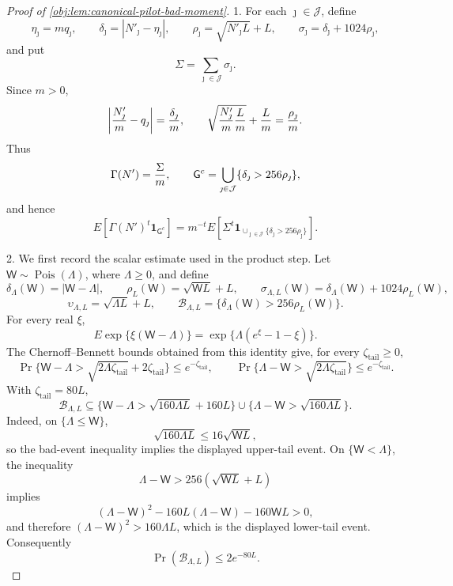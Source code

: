 \documentclass[11pt]{article}
\begin{document}
\begin{proof}[Proof of \cref{obj:lem:canonical-pilot-bad-moment}]
1.  For each \(\jmath\in\mathcal J\), define
\[
\eta_\jmath=mq_\jmath,\qquad
\delta_\jmath=\left|N'_\jmath-\eta_\jmath\right|,
\qquad
\rho_\jmath=\sqrt{N'_\jmath L}+L,
\qquad
\sigma_\jmath=\delta_\jmath+1024\rho_\jmath,
\]
and put
\[
\Sigma=\sum_{\jmath\in\mathcal J}\sigma_\jmath .
\]
Since \(m>0\),
\[
\left|{N'_\jmath\over m}-q_\jmath\right|
={\delta_\jmath\over m},
\qquad
\sqrt{{N'_\jmath\over m}{L\over m}}+{L\over m}
={\rho_\jmath\over m}.
\]
Thus
\[
\Gamma(N')={\Sigma\over m},
\qquad
\mathsf G^c
=
\bigcup_{\jmath\in\mathcal J}
\{\delta_\jmath>256\rho_\jmath\},
\]
and hence
\[
E\!\left[\Gamma(N')^t\mathbf 1_{\mathsf G^c}\right]
=
m^{-t}
E\!\left[
\Sigma^t
\mathbf 1_{\cup_{\jmath\in\mathcal J}\{\delta_\jmath>256\rho_\jmath\}}
\right].
\]

2.  We first record the scalar estimate used in the product step.  Let
\(\mathsf W\sim\operatorname{Pois}(\Lambda)\), where \(\Lambda\ge0\), and define
\[
\delta_{\Lambda}(\mathsf W)=|\mathsf W-\Lambda|,
\qquad
\rho_L(\mathsf W)=\sqrt{\mathsf W L}+L,
\qquad
\sigma_{\Lambda,L}(\mathsf W)
=
\delta_{\Lambda}(\mathsf W)+1024\rho_L(\mathsf W),
\]
\[
\upsilon_{\Lambda,L}=\sqrt{\Lambda L}+L,
\qquad
\mathcal B_{\Lambda,L}
=
\{\delta_{\Lambda}(\mathsf W)>256\rho_L(\mathsf W)\}.
\]
For every real \(\xi\),
\[
E\exp\{\xi(\mathsf W-\Lambda)\}
=
\exp\{\Lambda(e^\xi-1-\xi)\}.
\]
The Chernoff--Bennett bounds obtained from this identity give, for every
\(\zeta_{\mathrm{tail}}\ge0\),
\[
\Pr\{\mathsf W-\Lambda>\sqrt{2\Lambda\zeta_{\mathrm{tail}}}
       +2\zeta_{\mathrm{tail}}\}\le e^{-\zeta_{\mathrm{tail}}},
\qquad
\Pr\{\Lambda-\mathsf W>\sqrt{2\Lambda\zeta_{\mathrm{tail}}}\}
\le e^{-\zeta_{\mathrm{tail}}}.
\]
With \(\zeta_{\mathrm{tail}}=80L\),
\[
\mathcal B_{\Lambda,L}
\subseteq
\{\mathsf W-\Lambda>\sqrt{160\Lambda L}+160L\}
\cup
\{\Lambda-\mathsf W>\sqrt{160\Lambda L}\}.
\]
Indeed, on \(\{\Lambda\le\mathsf W\}\),
\[
\sqrt{160\Lambda L}\le16\sqrt{\mathsf W L},
\]
so the bad-event inequality implies the displayed upper-tail event.  On
\(\{\mathsf W<\Lambda\}\), the inequality
\[
\Lambda-\mathsf W>256(\sqrt{\mathsf W L}+L)
\]
implies
\[
(\Lambda-\mathsf W)^2-160L(\Lambda-\mathsf W)-160\mathsf W L>0,
\]
and therefore \((\Lambda-\mathsf W)^2>160\Lambda L\), which is the displayed
lower-tail event.  Consequently
\[
\Pr(\mathcal B_{\Lambda,L})\le 2e^{-80L}.
\]


\end{proof}
\end{document}
